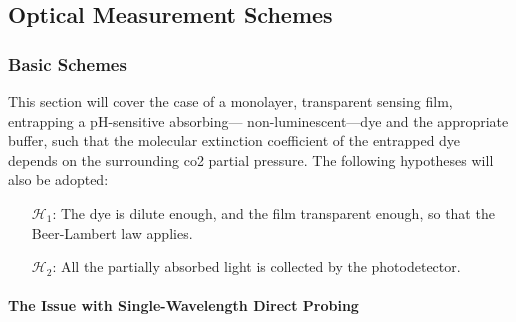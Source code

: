 \subsection{Optical Measurement Schemes}\label{sect:choos:dye_based:optical_schemes}

\subsubsection{Basic Schemes}\label{sect:choos:dye_based:optical_schemes:basic}

This section will cover the case of a monolayer, transparent sensing film, entrapping a pH-sensitive absorbing---\ie{} non-luminescent---dye and the appropriate buffer, such that the molecular extinction coefficient of the entrapped dye depends on the surrounding \gls{co2} partial pressure. The following hypotheses will also be adopted:
\begin{itemize}
	\item[$\mathcal{H}_1$:] The dye is dilute enough, and the film transparent enough, so that the Beer-Lambert law applies.
	\item[$\mathcal{H}_2$:] All the partially absorbed light is collected by the photodetector.
\end{itemize}

\paragraph{The Issue with Single-Wavelength Direct Probing}\label{subsect:choos:dye_based:optical_schemes:single_issue}\mbox{}\\

